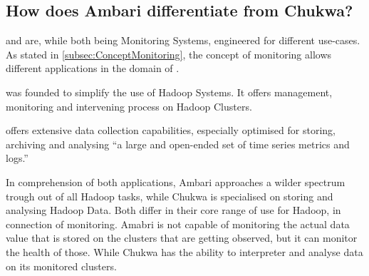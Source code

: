 \subsection{How does Ambari differentiate from Chukwa?}
\label{subsec:Differentiation}

\amb and \chuk are, while both being Monitoring Systems, engineered for different use-cases. 
As stated in \ref{subsec:ConceptMonitoring}, the concept of monitoring allows different applications in the domain of \isds. 

\amb was founded to simplify the use of Hadoop Systems. It offers management, monitoring and intervening process on Hadoop Clusters.\cite{Hortonworks2013} 

\chuk offers extensive data collection capabilities, especially optimised for storing, archiving and analysing ``a large and open-ended set of time series metrics and logs.''~\cite{Boulona}

In comprehension of both applications, Ambari approaches a wilder spectrum trough out of all Hadoop tasks, while Chukwa is specialised on storing and analysing Hadoop Data. Both differ in their core range of use for Hadoop, in connection of monitoring. Amabri is not capable of monitoring the actual data value that is stored on the clusters that are getting observed, but it can monitor the health of those.\cite{ApacheSoftwareFoundation2015} While Chukwa has the ability to interpreter and analyse data on its monitored clusters.